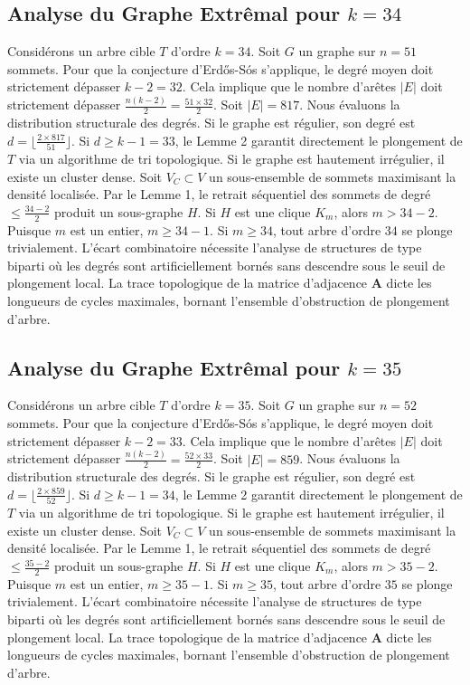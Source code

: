 \documentclass[11pt,a4paper]{article}
\begin{document}
\subsection{Analyse du Graphe Extr\^emal pour $k=34$}
Consid\'erons un arbre cible $T$ d'ordre $k=34$.
Soit $G$ un graphe sur $n=51$ sommets.
Pour que la conjecture d'Erd\H{o}s-S\'os s'applique, le degr\'e moyen doit strictement d\'epasser $k-2 = 32$.
Cela implique que le nombre d'ar\^etes $|E|$ doit strictement d\'epasser $\frac{n(k-2)}{2} = \frac{51 \times 32}{2}$.
Soit $|E| = 817$.
Nous \'evaluons la distribution structurale des degr\'es. Si le graphe est r\'egulier, son degr\'e est $d = \lfloor \frac{2 \times 817}{51} \rfloor$.
Si $d \geq k-1 = 33$, le Lemme 2 garantit directement le plongement de $T$ via un algorithme de tri topologique.
Si le graphe est hautement irr\'egulier, il existe un cluster dense. Soit $V_C \subset V$ un sous-ensemble de sommets maximisant la densit\'e localis\'ee.
Par le Lemme 1, le retrait s\'equentiel des sommets de degr\'e $\leq \frac{34-2}{2}$ produit un sous-graphe $H$.
Si $H$ est une clique $K_{m}$, alors $m > 34-2$. Puisque $m$ est un entier, $m \geq 34-1$. Si $m \geq 34$, tout arbre d'ordre $34$ se plonge trivialement.
L'\'ecart combinatoire n\'ecessite l'analyse de structures de type biparti o\`u les degr\'es sont artificiellement born\'es sans descendre sous le seuil de plongement local. La trace topologique de la matrice d'adjacence $\mathbf{A}$ dicte les longueurs de cycles maximales, bornant l'ensemble d'obstruction de plongement d'arbre.


\subsection{Analyse du Graphe Extr\^emal pour $k=35$}
Consid\'erons un arbre cible $T$ d'ordre $k=35$.
Soit $G$ un graphe sur $n=52$ sommets.
Pour que la conjecture d'Erd\H{o}s-S\'os s'applique, le degr\'e moyen doit strictement d\'epasser $k-2 = 33$.
Cela implique que le nombre d'ar\^etes $|E|$ doit strictement d\'epasser $\frac{n(k-2)}{2} = \frac{52 \times 33}{2}$.
Soit $|E| = 859$.
Nous \'evaluons la distribution structurale des degr\'es. Si le graphe est r\'egulier, son degr\'e est $d = \lfloor \frac{2 \times 859}{52} \rfloor$.
Si $d \geq k-1 = 34$, le Lemme 2 garantit directement le plongement de $T$ via un algorithme de tri topologique.
Si le graphe est hautement irr\'egulier, il existe un cluster dense. Soit $V_C \subset V$ un sous-ensemble de sommets maximisant la densit\'e localis\'ee.
Par le Lemme 1, le retrait s\'equentiel des sommets de degr\'e $\leq \frac{35-2}{2}$ produit un sous-graphe $H$.
Si $H$ est une clique $K_{m}$, alors $m > 35-2$. Puisque $m$ est un entier, $m \geq 35-1$. Si $m \geq 35$, tout arbre d'ordre $35$ se plonge trivialement.
L'\'ecart combinatoire n\'ecessite l'analyse de structures de type biparti o\`u les degr\'es sont artificiellement born\'es sans descendre sous le seuil de plongement local. La trace topologique de la matrice d'adjacence $\mathbf{A}$ dicte les longueurs de cycles maximales, bornant l'ensemble d'obstruction de plongement d'arbre.
\end{document}
